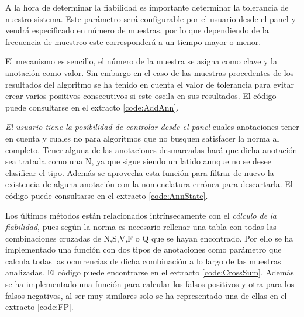     A la hora de determinar la fiabilidad es importante determinar la tolerancia de nuestro sistema. Este parámetro será configurable por el usuario desde el panel y vendrá especificado en número de muestras, por lo que dependiendo de la frecuencia de muestreo este corresponderá a un tiempo mayor o menor.

    El mecanismo es sencillo, el número de la muestra se asigna como clave y la anotación como valor. Sin embargo en el caso de las muestras procedentes de los resultados del algoritmo se ha tenido en cuenta el valor de tolerancia para evitar crear varios positivos consecutivos si este oscila en sus resultados. El código puede consultarse en el extracto \ref{code:AddAnn}.
        

    \textit{El usuario tiene la posibilidad de controlar desde el panel} cuales anotaciones tener en cuenta y cuales no para algoritmos que no busquen satisfacer la norma al completo. Tener alguna de las anotaciones desmarcadas hará que dicha anotación sea tratada como una N, ya que sigue siendo un latido aunque no se desee clasificar el tipo. Además se aprovecha esta función para filtrar de nuevo la existencia de alguna anotación con la nomenclatura errónea para descartarla. El código puede consultarse en el extracto \ref{code:AnnState}.
        
        
    Los últimos métodos están relacionados intrínsecamente con el \textit{cálculo de la fiabilidad}, pues según la norma es necesario rellenar una tabla con todas las combinaciones cruzadas de N,S,V,F o Q que se hayan encontrado. Por ello se ha implementado una función con dos tipos de anotaciones como parámetro que calcula todas las ocurrencias de dicha combinación a lo largo de las muestras analizadas. El código puede encontrarse en el extracto \ref{code:CrossSum}. Además se ha implementado una función para calcular los falsos positivos y otra para los falsos negativos, al ser muy similares solo se ha representado una de ellas en el extracto \ref{code:FP}.
        
  

